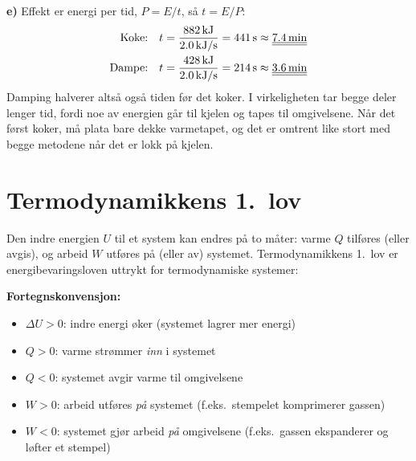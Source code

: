 {\smallskip\noindent
\textbf{e)} Effekt er energi per tid, $P = E/t$, så $t = E/P$:
\begin{align*}
  \text{Koke:}\quad t &= \frac{882\,\text{kJ}}{2.0\,\text{kJ/s}} = 441\,\text{s} \approx \underline{\underline{7.4\,\text{min}}}\\
  \text{Dampe:}\quad t &= \frac{428\,\text{kJ}}{2.0\,\text{kJ/s}} = 214\,\text{s} \approx \underline{\underline{3.6\,\text{min}}}
\end{align*}
Damping halverer altså også tiden før det koker. I virkeligheten tar begge deler lenger tid, fordi noe av energien går til kjelen og tapes til omgivelsene. Når det først koker, må plata bare dekke varmetapet, og det er omtrent like stort med begge metodene når det er lokk på kjelen.
}




\section{Termodynamikkens 1.\ lov}
\label{sec:1lov}

Den indre energien $U$ til et system kan endres på to måter: varme $Q$ tilføres (eller avgis), og arbeid $W$ utføres på (eller av) systemet. Termodynamikkens 1.\ lov er energibevaringsloven uttrykt for termodynamiske systemer:


\begin{tcolorbox}[colback=gray!13, colframe=gray!40, boxrule=0.5pt,
    arc=2pt, left=6pt, right=6pt, top=4pt, bottom=4pt]
\textbf{Fortegnskonvensjon:}
\begin{itemize}
  \item $\Delta U > 0$: indre energi øker (systemet lagrer mer energi)
  \item $Q > 0$: varme strømmer \emph{inn} i systemet
  \item $Q < 0$: systemet avgir varme til omgivelsene
  \item $W > 0$: arbeid utføres \emph{på} systemet (f.eks.\ stempelet komprimerer gassen)
  \item $W < 0$: systemet gjør arbeid \emph{på} omgivelsene (f.eks.\ gassen ekspanderer og løfter et stempel)
\end{itemize}
\end{tcolorbox}


